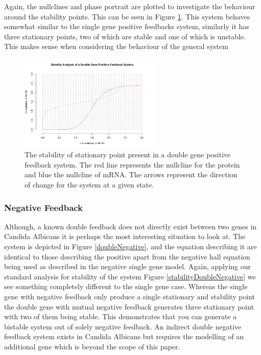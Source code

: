 \documentclass[]{article}
\begin{document}
            Again, the nullclines and phase portrait are plotted to investigate the behaviour around the stability points. This can be seen in Figure \ref{stabilityDoublePositive}. This system behaves somewhat similar to the single gene positive feedbacks system, similarly it has three stationary points, two of which are stable and one of  which is unstable. This makes sense when considering the behaviour of the general system %
            
            \begin{figure}[h]
            \centering
            \includegraphics[width=0.6\textwidth]{./figures/stabilityDoublePositive.jpeg}
            \caption{The stability of stationary point present in a double gene positive feedback system. The red line represents the nullcline for the protein and blue the nullcline of mRNA. The arrows represent the direction of change for the system at a given state.}
            \label{stabilityDoublePositive}
            \end{figure}
            
            \subsubsection{Negative Feedback}
            Although, a known double feedback does not directly exist between two genes in Candida Albicans it is perhaps the most interesting situation to look at. The system is depicted in Figure \ref{doubleNegative}, and the equation describing it are identical to those describing the positive apart from the negative hall equation being used as described in the negative single gene model. Again, applying our standard analysis for stability of the system Figure \ref{stabilityDoubleNegative} we see something completely different to the single gene case. Whereas the single gene with negative feedback only produce a single stationary and stability point the double gene with mutual negative feedback generates three stationary point with two of them being stable. This demonstrates that you can generate a bistable system out of solely negative feedback. An indirect double negative feedback system exists in Candida Albicans but requires the modelling of an additional gene which is beyond the scope of this paper.
            
\end{document}
